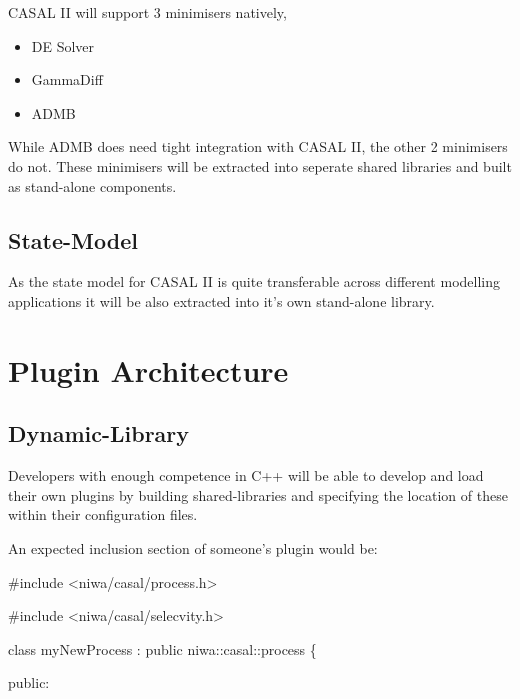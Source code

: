 \documentclass[a4paper,11pt,twoside,pdftex,draft]{article}
\providecommand{\tightlist}{%
  \setlength{\itemsep}{0pt}\setlength{\parskip}{0pt}}
\begin{document}
CASAL II will support 3 minimisers natively,

\begin{itemize}
\tightlist
\item
  DE Solver
\item
  GammaDiff
\item
  ADMB
\end{itemize}

While ADMB does need tight integration with CASAL II, the other 2
minimisers do not. These minimisers will be extracted into seperate
shared libraries and built as stand-alone components.

\hypertarget{state-model}{%
\subsection[State-Model]{\texorpdfstring{\protect\hypertarget{anchor-23}{}{}State-Model}{State-Model}}\label{state-model}}

As the state model for CASAL II is quite transferable across different
modelling applications it will be also extracted into it's own
stand-alone library.

\hypertarget{plugin-architecture}{%
\section[Plugin
Architecture]{\texorpdfstring{\protect\hypertarget{anchor-24}{}{}Plugin
Architecture}{Plugin Architecture}}\label{plugin-architecture}}

\hypertarget{dynamic-library}{%
\subsection[Dynamic-Library]{\texorpdfstring{\protect\hypertarget{anchor-25}{}{}Dynamic-Library}{Dynamic-Library}}\label{dynamic-library}}

Developers with enough competence in C++ will be able to develop and
load their own plugins by building shared-libraries and specifying the
location of these within their configuration files.

An expected inclusion section of someone's plugin would be:

\#include \textless niwa/casal/process.h\textgreater{}

\#include \textless niwa/casal/selecvity.h\textgreater{}

class myNewProcess : public niwa::casal::process \{

public:
\end{document}
